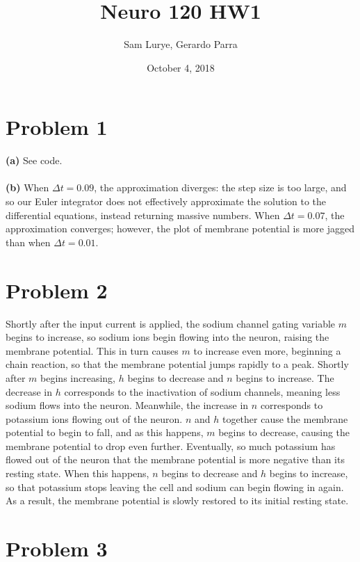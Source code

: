 \documentclass[]{article}
\begin{document}
\title{Neuro 120 HW1}
\author{Sam Lurye, Gerardo Parra}
\date{October 4, 2018}
\maketitle

\section*{Problem 1}

\textbf{(a)} See code.
\\\\
\textbf{(b)} When $\Delta t=0.09$, the approximation diverges: the step size is too large, and so our Euler integrator does not effectively approximate the solution to the differential equations, instead returning massive numbers. When $\Delta t=0.07$, the approximation converges; however, the plot of membrane potential is more jagged than when $\Delta t=0.01$.

\section*{Problem 2}

Shortly after the input current is applied, the sodium channel gating variable $m$ begins to increase, so sodium ions begin flowing into the neuron, raising the membrane potential. This in turn causes $m$ to increase even more, beginning a chain reaction, so that the membrane potential jumps rapidly to a peak. Shortly after $m$ begins increasing, $h$ begins to decrease and $n$ begins to increase. The decrease in $h$ corresponds to the inactivation of sodium channels, meaning less sodium flows into the neuron. Meanwhile, the increase in $n$ corresponds to potassium ions flowing out of the neuron. $n$ and $h$ together cause the membrane potential to begin to fall, and as this happens, $m$ begins to decrease, causing the membrane potential to drop even further. Eventually, so much potassium has flowed out of the neuron that the membrane potential is more negative than its resting state. When this happens, $n$ begins to decrease and $h$ begins to increase, so that potassium stops leaving the cell and sodium can begin flowing in again. As a result, the membrane potential is slowly restored to its initial resting state.

\section*{Problem 3}
\end{document}
